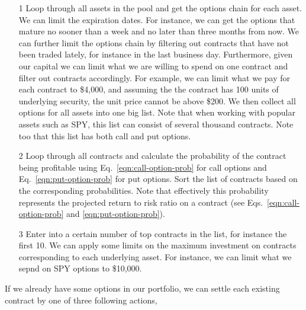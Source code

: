\documentclass{article}
\begin{document}
\begin{itemize}
  
  \item[1] Loop through all assets in the pool and get the options
    chain for each asset. We can limit the expiration dates. For
    instance, we can get the options that mature no sooner than a week
    and no later than three months from now. We can further limit the
    options chain by filtering out contracts that have not been traded
    lately, for instance in the last business day. Furthermore, given
    our capital we can limit what we are willing to spend on one
    contract and filter out contracts accordingly. For example, we can
    limit what we pay for each contract to \$4,000, and assuming the
    the contract has 100 units of underlying security, the unit price
    cannot be above \$200. We then collect all options for all assets
    into one big list. Note that when working with popular assets such
    as SPY, this list can consist of several thousand contracts. Note
    too that this list has both call and put options.

  \item[2] Loop through all contracts and calculate the probability of
    the contract being profitable using
    Eq.~\ref{eqn:call-option-prob} for call options and
    Eq.~\ref{eqn:put-option-prob} for put options. Sort the list of
    contracts based on the corresponding probabilities. Note that
    effectively this probability represents the projected return to
    risk ratio on a contract (see Eqs.~\ref{eqn:call-option-prob} and
    \ref{eqn:put-option-prob}).

   \item[3] Enter into a certain number of top contracts in the list,
     for instance the first 10. We can apply some limits on the
     maximum investment on contracts corresponding to each underlying
     asset. For instance, we can limit what we sepnd on SPY options to
     \$10,000.

\end{itemize}

If we already have some options in our portfolio, we can settle each
existing contract by one of three following actions, 
\end{document}
